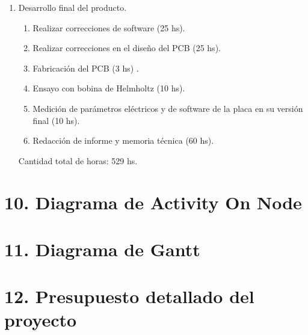 \documentclass[
11pt, %
]{charter}
\begin{document}
\begin{enumerate}
\begin{enumerate}
		\end{enumerate}
	\item Desarrollo final del producto. 
		\begin{enumerate}
			\item Realizar correcciones de software (25 hs). 
			\item Realizar correcciones en el diseño del PCB (25 hs).
			\item Fabricación del PCB (3 hs) . 
			\item Ensayo con bobina de Helmholtz (10 hs). 		
			\item Medición de parámetros eléctricos y de software de la placa en su versión final (10 hs). 
			\item Redacción de informe y memoria técnica (60 hs). 
		\end{enumerate}

Cantidad total de horas: 529 hs.  


\end{enumerate}





\section{10. Diagrama de Activity On Node}
\label{sec:AoN}






\section{11. Diagrama de Gantt}
\label{sec:gantt}

\section{12. Presupuesto detallado del proyecto}
\label{sec:presupuesto}
\end{document}
